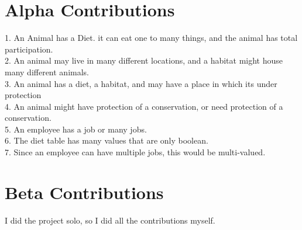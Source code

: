 \documentclass[11pt]{article}
\theoremstyle{plain}
\theoremstyle{definition}
\begin{document}
\section{Alpha Contributions}
1. An Animal has a Diet. it can eat one to many things, and the animal has total participation.\\
2. An animal may live in many different locations, and a habitat might house many different animals.\\
3. An animal has a diet, a habitat, and may have a place in which its under protection\\
4. An animal might have protection of a conservation, or need protection of a conservation.\\
5. An employee has a job or many jobs.\\
6. The diet table has many values that are only boolean.\\
7. Since an employee can have multiple jobs, this would be multi-valued.\\

\section{Beta Contributions} 
I did the project solo, so I did all the contributions myself.
 
\end{document}
